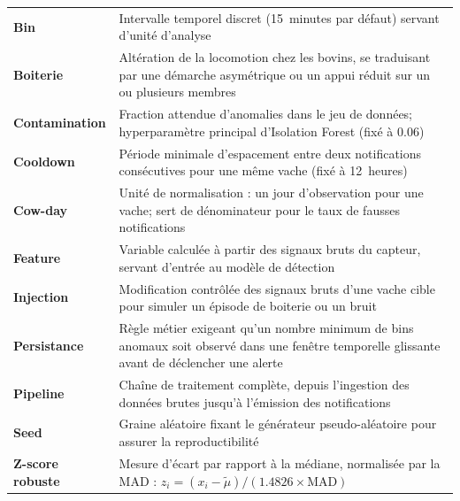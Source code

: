 \begin{tabular}{@{}lp{10cm}@{}}
\textbf{Bin}               & Intervalle temporel discret (15~minutes par défaut) servant d'unité d'analyse \\[3pt]
\textbf{Boiterie}          & Altération de la locomotion chez les bovins, se traduisant par une démarche asymétrique ou un appui réduit sur un ou plusieurs membres \\[3pt]
\textbf{Contamination}     & Fraction attendue d'anomalies dans le jeu de données; hyperparamètre principal d'Isolation Forest (fixé à 0.06) \\[3pt]
\textbf{Cooldown}          & Période minimale d'espacement entre deux notifications consécutives pour une même vache (fixé à 12~heures) \\[3pt]
\textbf{Cow-day}           & Unité de normalisation : un jour d'observation pour une vache; sert de dénominateur pour le taux de fausses notifications \\[3pt]
\textbf{Feature}           & Variable calculée à partir des signaux bruts du capteur, servant d'entrée au modèle de détection \\[3pt]
\textbf{Injection}         & Modification contrôlée des signaux bruts d'une vache cible pour simuler un épisode de boiterie ou un bruit \\[3pt]
\textbf{Persistance}       & Règle métier exigeant qu'un nombre minimum de bins anomaux soit observé dans une fenêtre temporelle glissante avant de déclencher une alerte \\[3pt]
\textbf{Pipeline}          & Chaîne de traitement complète, depuis l'ingestion des données brutes jusqu'à l'émission des notifications \\[3pt]
\textbf{Seed}              & Graine aléatoire fixant le générateur pseudo-aléatoire pour assurer la reproductibilité \\[3pt]
\textbf{Z-score robuste}   & Mesure d'écart par rapport à la médiane, normalisée par la MAD : $z_i = (x_i - \tilde{\mu}) / (1.4826 \times \text{MAD})$ \\[3pt]
\end{tabular}
